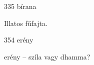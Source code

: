 
\begin{notesdescription}

\item[{335}
{bírana}
{}] \hfill\par

Illatos fűfajta.

\item[{354}
{erény}
{}] \hfill\par

erény -- szíla vagy dhamma?

\end{notesdescription}

